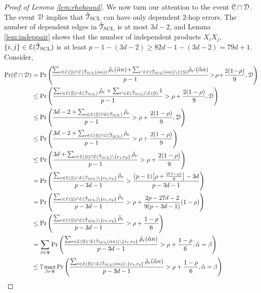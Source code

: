 \begin{proof}[Proof of Lemma \ref{lem:rhobound}]
	We now turn our attention to the event $ \mathcal{C}\cap \mathcal{D}$. The event $\mathcal{D}$ implies that $ \hat{\mathcal{T}}_{\rm{SCL}}$ can have only dependent $2$-hop errors. The number
	of dependent edges in $ \hat{\mathcal{T}}_{\rm{SCL}}$ is at most $3d-2$, and Lemma \ref{lem:indeppair} shows that the number of independent products $X_{i}X_{j}$, $\{i,j\}\in\mathcal{E}(\hat{\mathcal{T}}_{{\rm SCL}})$ 
	is at least $p-1-(3d-2)\geq 82d-1-(3d-2)=79d+1$. Consider,
	\begin{align}
		\Pr( \calC\cap \calD)&=\Pr\Bigg(\!\frac{\sum_{e\in\calE(\calG)\cap\calE( \hatcalT_{\rm{SCL}}(\halpha n))}\hrho_{e}(\halpha n)\!+\!\sum_{e^{\prime}\in\calE( \hatcalT_{\rm{SCL}}(\halpha n))\backslash\calE(\calG)}\!\hrho_{e^{\prime}}(\halpha n)}{p-1}\!>\!\rho\!+\!\frac{2(1\!-\!\rho)}{9},\calD\Bigg)\\
		&\leq\Pr\Bigg(\frac{\sum_{e\in\calE(\calG)\cap\calE( \hatcalT_{\rm{SCL}})}\hrho_{e}+\sum_{e^{\prime}\in\calE( \hatcalT_{\rm{SCL}})\backslash\calE(\calG)}1}{p-1}>\rho+\frac{2(1-\rho)}{9},\calD\Bigg)\\
		&\leq\Pr\Bigg(\frac{3d-2+\sum_{e\in\calE(\calG)\cap\calE( \hatcalT_{\rm{SCL}})}\hrho_{e}}{p-1}>\rho+\frac{2(1-\rho)}{9},\calD\Bigg)\label{ieq:ieq2}\\
		&\leq\Pr\Bigg(\frac{3d-2+\sum_{e\in\calE(\calG)\cap\calE( \hatcalT_{\rm{SCL}})}\hrho_{e}}{p-1}>\rho+\frac{2(1-\rho)}{9}\Bigg)\\
		&\leq\Pr\Bigg(\frac{3d+\sum_{e\in\calE(\calG)\cap\calE( \hatcalT_{\rm{SCL}})\backslash \{e_{1},e_{2}\}}\hrho_{e}}{p-1}>\rho+\frac{2(1-\rho)}{9}\Bigg)\label{ieq:ieq3}\\
		&=\Pr\Bigg(\frac{\sum_{e\in\calE(\calG)\cap\calE( \hatcalT_{\rm{SCL}})\backslash \{e_{1},e_{2}\}}\hrho_{e}}{p-3d-1}>\frac{(p-1)\big[\rho+\frac{2(1-\rho)}{9}\big]-3d}{p-3d-1}\Bigg)\\
		&=\Pr\Bigg(\frac{\sum_{e\in\calE(\calG)\cap\calE( \hatcalT_{\rm{SCL}})\backslash \{e_{1},e_{2}\}}\hrho_{e}}{p-3d-1}>\rho+\frac{2p-27d-2}{9(p-3d-1)}(1-\rho)\Bigg)\\
		&\leq\Pr\Bigg(\frac{\sum_{e\in\calE(\calG)\cap\calE( \hatcalT_{\rm{SCL}})\backslash \{e_{1},e_{2}\}}\hrho_{e}}{p-3d-1}>\rho+\frac{1-\rho}{6}\Bigg)\label{ieq:ieq5}\\
		&=\sum_{\beta\in\Psi}\Pr\Bigg(\frac{\sum_{e\in\calE(\calG)\cap\calE( \hatcalT_{\rm{SCL}}(\halpha n))\backslash \{e_{1},e_{2}\}}\hrho_{e}(\halpha n)}{p-3d-1}>\rho+\frac{1-\rho}{6},\halpha=\beta\Bigg)\label{eq:ome}\\
		&\leq 7\max_{\beta \in \Psi}\Pr\Bigg(\frac{\sum_{e\in\calE(\calG)\cap\calE( \hatcalT_{\rm{SCL}}(\halpha n))\backslash \{e_{1},e_{2}\}}\hrho_{e}(\halpha n)}{p-3d-1}>\rho+\frac{1-\rho}{6},\halpha=\beta\Bigg)\\

\end{align}
\end{proof}

